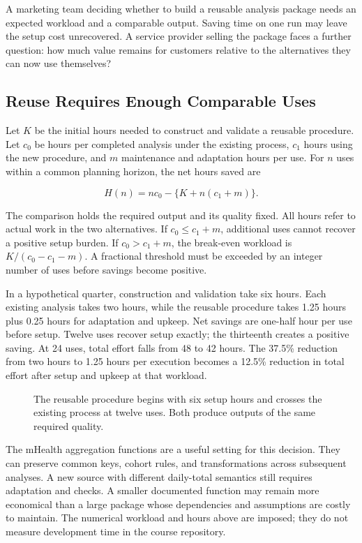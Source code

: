 \noindent \noindent A marketing team deciding whether to build a reusable analysis
package needs an expected workload and a comparable output. Saving time
on one run may leave the setup cost unrecovered. A service provider
selling the package faces a further question: how much value remains for
customers relative to the alternatives they can now use themselves?

\hypertarget{M08-reuse-requires-enough-comparable-uses}{%
\subsection{Reuse Requires Enough Comparable
Uses}\label{M08-reuse-requires-enough-comparable-uses}}

\noindent \noindent Let \(K\) be the initial hours needed to construct and
validate a reusable procedure. Let \(c_0\) be hours per completed
analysis under the existing process, \(c_1\) hours using the new
procedure, and \(m\) maintenance and adaptation hours per use. For \(n\)
uses within a common planning horizon, the net hours saved are

\[
H(n)=nc_0-\{K+n(c_1+m)\}.
\]

The comparison holds the required output and its quality fixed. All
hours refer to actual work in the two alternatives. If
\(c_0\leq c_1+m\), additional uses cannot recover a positive setup
burden. If \(c_0>c_1+m\), the break-even workload is \(K/(c_0-c_1-m)\).
A fractional threshold must be exceeded by an integer number of uses
before savings become positive.

In a hypothetical quarter, construction and validation take six hours.
Each existing analysis takes two hours, while the reusable procedure
takes 1.25 hours plus 0.25 hours for adaptation and upkeep. Net savings
are one-half hour per use before setup. Twelve uses recover setup
exactly; the thirteenth creates a positive saving. At 24 uses, total
effort falls from 48 to 42 hours. The 37.5\% reduction from two hours to
1.25 hours per execution becomes a 12.5\% reduction in total effort
after setup and upkeep at that workload.

\begin{figure}[htbp]
\centering

\caption{The reusable procedure begins with six setup hours and crosses the existing process at twelve uses. Both produce outputs of the same required quality.}\label{fig:M08_reuse_costs}
\end{figure}

The mHealth aggregation functions are a useful setting for this
decision. They can preserve common keys, cohort rules, and
transformations across subsequent analyses. A new source with different
daily-total semantics still requires adaptation and checks. A smaller
documented function may remain more economical than a large package
whose dependencies and assumptions are costly to maintain. The numerical
workload and hours above are imposed; they do not measure development
time in the course repository.

